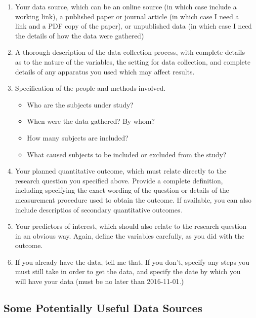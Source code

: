 \documentclass[]{book}
\providecommand{\tightlist}{%
  \setlength{\itemsep}{0pt}\setlength{\parskip}{0pt}}
\theoremstyle{definition}
\theoremstyle{definition}
\theoremstyle{definition}
\theoremstyle{remark}
\begin{document}
\begin{enumerate}
\def\labelenumi{\arabic{enumi}.}
\item
  Your data source, which can be an online source (in which case include
  a working link), a published paper or journal article (in which case I
  need a link and a PDF copy of the paper), or unpublished data (in
  which case I need the details of how the data were gathered)
\item
  A thorough description of the data collection process, with complete
  details as to the nature of the variables, the setting for data
  collection, and complete details of any apparatus you used which may
  affect results.
\item
  Specification of the people and methods involved.

  \begin{itemize}
  \tightlist
  \item
    Who are the subjects under study?
  \item
    When were the data gathered? By whom?
  \item
    How many subjects are included?
  \item
    What caused subjects to be included or excluded from the study?
  \end{itemize}
\item
  Your planned quantitative outcome, which must relate directly to the
  research question you specified above. Provide a complete definition,
  including specifying the exact wording of the question or details of
  the measurement procedure used to obtain the outcome. If available,
  you can also include descriptios of secondary quantitative outcomes.
\item
  Your predictors of interest, which should also relate to the research
  question in an obvious way. Again, define the variables carefully, as
  you did with the outcome.
\item
  If you already have the data, tell me that. If you don't, specify any
  steps you must still take in order to get the data, and specify the
  date by which you will have your data (must be no later than
  2016-11-01.)
\end{enumerate}

\hypertarget{some-potentially-useful-data-sources}{%
\subsection{Some Potentially Useful Data
Sources}\label{some-potentially-useful-data-sources}}
\end{document}
